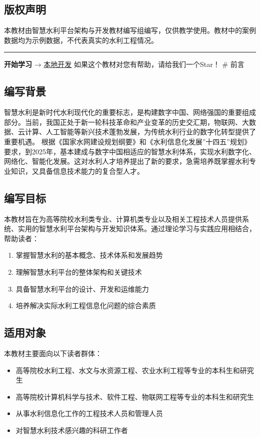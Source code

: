 \subsection{版权声明}\label{ux7248ux6743ux58f0ux660e} 本教材由智慧水利平台架构与开发教材编写组编写，仅供教学使用。教材中的案例数据均为示例数据，不代表真实的水利工程情况。
\begin{center}\rule{0.5\linewidth}{0.5pt}\end{center} \textbf{开始学习} → \hyperref[ux672cux5730ux5f00ux53d1]{本地开发}
如果这个教材对您有帮助，请给我们一个Star！ \# 前言 \subsection{编写背景}\label{ux7f16ux5199ux80ccux666f}
智慧水利是新时代水利现代化的重要标志，是构建数字中国、网络强国的重要组成部分。当前，我国正处于新一轮科技革命和产业变革的历史交汇期，物联网、大数据、云计算、人工智能等新兴技术蓬勃发展，为传统水利行业的数字化转型提供了重要机遇。
根据《国家水网建设规划纲要》和《水利信息化发展''十四五''规划》要求，到2025年，基本建成与数字中国相适应的智慧水利体系，实现水利数字化、网络化、智能化发展。这对水利人才培养提出了新的要求，急需培养既掌握水利专业知识，又具备信息技术能力的复合型人才。
\subsection{编写目标}\label{ux7f16ux5199ux76eeux6807}
本教材旨在为高等院校水利类专业、计算机类专业以及相关工程技术人员提供系统、实用的智慧水利平台架构与开发知识体系。通过理论学习与实践应用相结合，帮助读者： \begin{enumerate}
\def\labelenumi{\arabic{enumi}.} \tightlist \item 掌握智慧水利的基本概念、技术体系和发展趋势 \item 理解智慧水利平台的整体架构和关键技术 \item
具备智慧水利平台的设计、开发和运维能力 \item 培养解决实际水利工程信息化问题的综合素质 \end{enumerate} \subsection{适用对象}\label{ux9002ux7528ux5bf9ux8c61-1}
本教材主要面向以下读者群体： \begin{itemize} \tightlist \item 高等院校水利工程、水文与水资源工程、农业水利工程等专业的本科生和研究生 \item
高等院校计算机科学与技术、软件工程、物联网工程等专业的本科生和研究生 \item 从事水利信息化工作的工程技术人员和管理人员 \item 对智慧水利技术感兴趣的科研工作者 \end{itemize}
